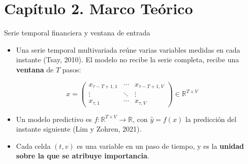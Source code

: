 \documentclass{beamer}
\begin{document}
\section[Capítulo 2]{Capítulo 2. Marco Teórico}

\begin{frame}{Serie temporal financiera y ventana de entrada}
    \small
    \begin{itemize}
        \item Una serie temporal multivariada reúne varias variables
        medidas en cada instante (Tsay, 2010). El modelo no recibe la
        serie completa, recibe una \textbf{ventana} de $T$ pasos:
    \end{itemize}
    \[
        x = \begin{pmatrix}
        x_{\tau-T+1,1} & \cdots & x_{\tau-T+1,V}\\
        \vdots & \ddots & \vdots\\
        x_{\tau,1} & \cdots & x_{\tau,V}
        \end{pmatrix} \in \mathbb{R}^{T\times V}
    \]
    \begin{itemize}
        \small
        \item Un modelo predictivo es $f\colon\mathbb{R}^{T\times V}
        \to\mathbb{R}$, con $\hat{y}=f(x)$ la predicción del instante
        siguiente (Lim y Zohren, 2021).
        \item Cada celda $(t,v)$ es una variable en un paso de tiempo, y
        es la \textbf{unidad sobre la que se atribuye importancia}.
    \end{itemize}
\end{frame}
\end{document}

